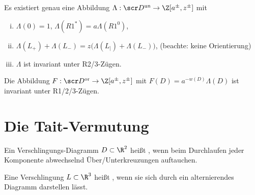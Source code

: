 \begin{st}[Kauffman, 1990]
    Es existiert genau eine Abbildung $\Lambda: \scr D^{\text{un}} \to \Z[a^\pm, z^\pm]$ mit
    \begin{enumerate}[i)]
        \item
            $\Lambda(0) = 1$, $\Lambda(R1^*) = a \Lambda(R1^0)$,
        \item
            $\Lambda(L_+) + \Lambda(L_-) = z\Big(\Lambda(L_|) + \Lambda(L_-)\Big)$,
            (beachte: keine Orientierung)
        \item
            $\Lambda$ ist invariant unter R2/3-Zügen.
    \end{enumerate}
    Die Abbildung $F: \scr D^{\text{or}} \to \Z[a^\pm, z^\pm]$ mit $F(D) = a^{-w(D)} \Lambda(D)$ ist invariant unter R1/2/3-Zügen.
\end{st}




\section{Die Tait-Vermutung}

\begin{df}
    Ein Verschlingungs-Diagramm $D \subset \R^2$ heißt , wenn beim Durchlaufen jeder Komponente abwechselnd Über/Unterkreuzungen auftauchen.

    Eine Verschlingung $L \subset \R^3$ heißt , wenn sie sich durch ein alternierendes Diagramm darstellen lässt.
\end{df}

